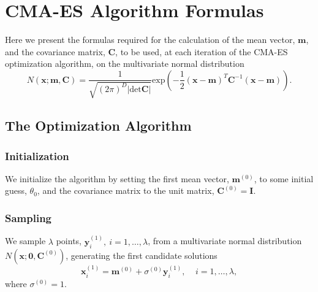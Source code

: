 
\chapter{CMA-ES Algorithm Formulas}
\label{chapter:CMAESAlg}

Here we present the formulas required for the calculation of the mean vector, $\mathbf{m}$, and the covariance matrix, $\mathbf{C}$, to be used, at each iteration of the CMA-ES optimization algorithm, on the multivariate normal distribution
\begin{equation}
N(\mathbf{x;m,C})=\frac{1}{\sqrt{(2\pi)^D|\mathrm{det}\mathbf{C}|}}\mathrm{exp}\left(-\frac{1}{2}(\mathbf{x}-\mathbf{m})^T\mathbf{C}^{-1}(\mathbf{x}-\mathbf{m})\right).
\end{equation}

\section{The Optimization Algorithm}
\subsection{Initialization}
We initialize the algorithm by setting the first mean vector, $\mathbf{m}^{(0)}$, to some initial guess, $\theta_0$, and the covariance matrix to the unit matrix, $\mathbf{C}^{(0)}=\mathbf{I}$.

\subsection{Sampling}
We sample $\lambda$ points, $\mathbf{y}_i^{(1)},\ i=1,\ldots,\lambda$, from a multivariate normal distribution $N(\mathbf{x};\mathbf{0},\mathbf{C}^{(0)})$, generating the first candidate solutions
\begin{equation}
\mathbf{x}^{(1)}_i=\mathbf{m}^{(0)}+\sigma^{(0)}\mathbf{y}^{(1)}_i, \ \ \ \ \ i=1,\ldots,\lambda,
\end{equation} 
\noindent where $\sigma^{(0)}=1$.

